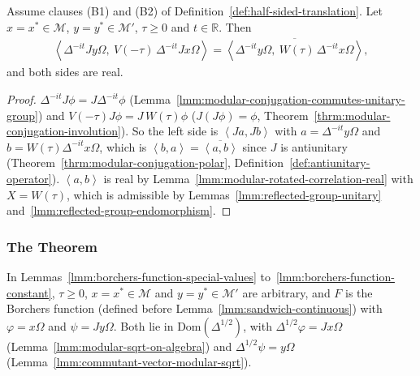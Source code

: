 \begin{lemma}
    \label{lmm:borchers-upper-boundary-real}
    \leanok
    Assume clauses (B1) and (B2) of Definition~\ref{def:half-sided-translation}. Let $x = x^* \in \mathcal{M}$, $y = y^* \in \mathcal{M}'$, $\tau \ge 0$ and $t \in \mathbb{R}$. Then
    \begin{align}
        \left< \Delta^{-it}Jy\Omega, \ V(-\tau)\,\Delta^{-it}Jx\Omega \right> = \overline{\left< \Delta^{-it}y\Omega, \ W(\tau)\,\Delta^{-it}x\Omega \right>},
    \end{align}
    and both sides are real.
\end{lemma}
\begin{proof}
    \leanok
    $\Delta^{-it}J\phi = J\Delta^{-it}\phi$ (Lemma~\ref{lmm:modular-conjugation-commutes-unitary-group}) and $V(-\tau)J\phi = J\,W(\tau)\phi$ ($J(J\phi) = \phi$, Theorem~\ref{thrm:modular-conjugation-involution}). So the left side is $\left< Ja, Jb \right>$ with $a = \Delta^{-it}y\Omega$ and $b = W(\tau)\Delta^{-it}x\Omega$, which is $\left< b, a \right> = \overline{\left< a, b \right>}$ since $J$ is antiunitary (Theorem~\ref{thrm:modular-conjugation-polar}, Definition~\ref{def:antiunitary-operator}). $\left< a, b \right>$ is real by Lemma~\ref{lmm:modular-rotated-correlation-real} with $X = W(\tau)$, which is admissible by Lemmas~\ref{lmm:reflected-group-unitary} and~\ref{lmm:reflected-group-endomorphism}.
\end{proof}

\subsubsection{The Theorem}

In Lemmas~\ref{lmm:borchers-function-special-values} to~\ref{lmm:borchers-function-constant}, $\tau \ge 0$, $x = x^* \in \mathcal{M}$ and $y = y^* \in \mathcal{M}'$ are arbitrary, and $F$ is the Borchers function (defined before Lemma~\ref{lmm:sandwich-continuous}) with $\varphi = x\Omega$ and $\psi = Jy\Omega$. Both lie in $\text{Dom}(\Delta^{1/2})$, with $\Delta^{1/2}\varphi = Jx\Omega$ (Lemma~\ref{lmm:modular-sqrt-on-algebra}) and $\Delta^{1/2}\psi = y\Omega$ (Lemma~\ref{lmm:commutant-vector-modular-sqrt}).

